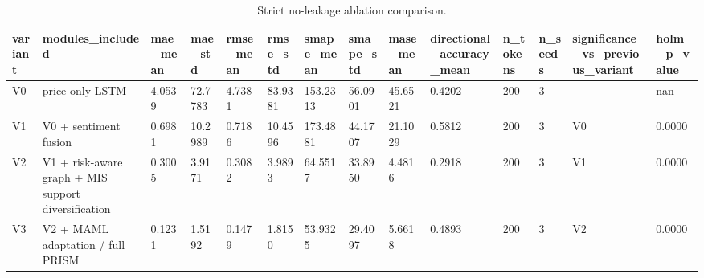 \begin{table}[htbp]
\centering
\begin{tabular}{llllllllllllll}
\hline
variant & modules_included & mae_mean & mae_std & rmse_mean & rmse_std & smape_mean & smape_std & mase_mean & directional_accuracy_mean & n_tokens & n_seeds & significance_vs_previous_variant & holm_p_value \\
\hline
V0 & price-only LSTM & 4.0539 & 72.7783 & 4.7381 & 83.9381 & 153.2313 & 56.0901 & 45.6521 & 0.4202 & 200 & 3 &  & nan \\
V1 & V0 + sentiment fusion & 0.6981 & 10.2989 & 0.7186 & 10.4596 & 173.4881 & 44.1707 & 21.1029 & 0.5812 & 200 & 3 & V0 & 0.0000 \\
V2 & V1 + risk-aware graph + MIS support diversification & 0.3005 & 3.9171 & 0.3082 & 3.9893 & 64.5517 & 33.8950 & 4.4816 & 0.2918 & 200 & 3 & V1 & 0.0000 \\
V3 & V2 + MAML adaptation / full PRISM & 0.1231 & 1.5192 & 0.1479 & 1.8150 & 53.9325 & 29.4097 & 5.6618 & 0.4893 & 200 & 3 & V2 & 0.0000 \\
\hline
\end{tabular}
\caption{Strict no-leakage ablation comparison.}
\label{table_ablation_strict}
\end{table}